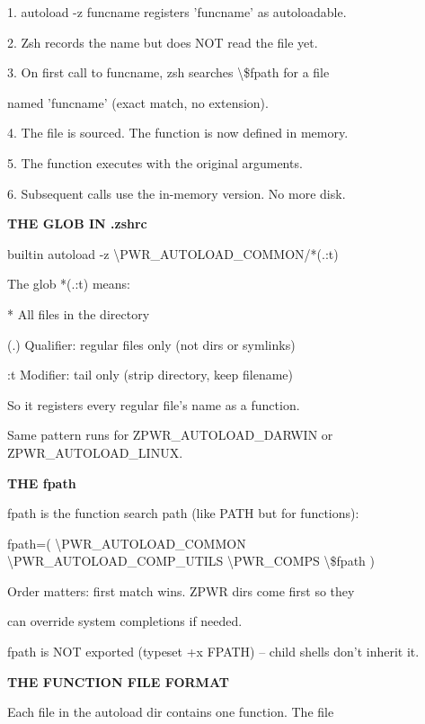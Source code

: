 \documentclass[11pt,a4paper,twoside]{book}
\begin{document}
1. autoload -z funcname registers 'funcname' as autoloadable.

2. Zsh records the name but does NOT read the file yet.

3. On first call to funcname, zsh searches \textbackslash{}\$fpath for a file

named 'funcname' (exact match, no extension).

4. The file is sourced. The function is now defined in memory.

5. The function executes with the original arguments.

6. Subsequent calls use the in-memory version. No more disk.


\vspace{12pt}
{\bfseries\color{neonyellow} THE GLOB IN .zshrc}\vspace{4pt}

builtin autoload -z \textbackslash{}PWR\_AUTOLOAD\_COMMON/*(.:t)

The glob *(.:t) means:

*    All files in the directory

(.)  Qualifier: regular files only (not dirs or symlinks)

:t   Modifier: tail only (strip directory, keep filename)

So it registers every regular file's name as a function.

Same pattern runs for ZPWR\_AUTOLOAD\_DARWIN or ZPWR\_AUTOLOAD\_LINUX.


\vspace{12pt}
{\bfseries\color{neonyellow} THE fpath}\vspace{4pt}

fpath is the function search path (like PATH but for functions):

fpath=( \textbackslash{}PWR\_AUTOLOAD\_COMMON \textbackslash{}PWR\_AUTOLOAD\_COMP\_UTILS \textbackslash{}PWR\_COMPS \textbackslash{}\$fpath )

Order matters: first match wins. ZPWR dirs come first so they

can override system completions if needed.

fpath is NOT exported (typeset +x FPATH) -- child shells don't inherit it.


\vspace{12pt}
{\bfseries\color{neonyellow} THE FUNCTION FILE FORMAT}\vspace{4pt}

Each file in the autoload dir contains one function. The file
\end{document}
